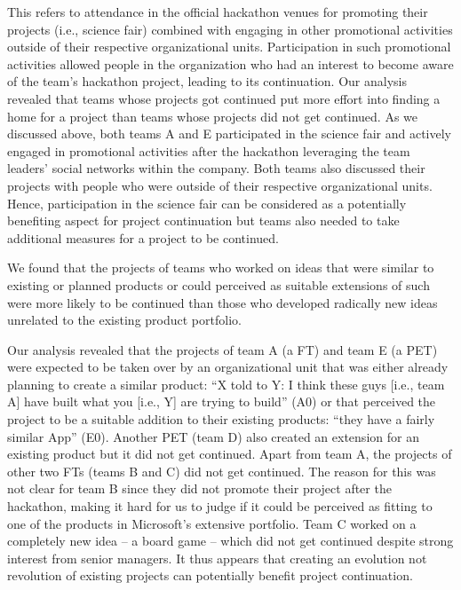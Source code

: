 \documentclass{hcij}
\begin{document}
This refers to attendance in the official hackathon venues for promoting their projects (i.e., science fair) combined with engaging in other promotional activities outside of their respective organizational units. Participation in such promotional activities allowed people in the organization who had an interest to become aware of the team’s hackathon project, leading to its continuation. Our analysis revealed that teams whose projects got continued put more effort into finding a home for a project than teams whose projects did not get continued. As we discussed above, both teams A and E participated in the science fair and actively engaged in promotional activities after the hackathon leveraging the team leaders’ social networks within the company. Both teams also discussed their projects with people who were outside of their respective organizational units. Hence, participation in the science fair can be considered as a potentially benefiting aspect for project continuation but teams also needed to take additional measures for a project to be continued.

We found that the projects of teams who worked on ideas that were similar to existing or planned products or could perceived as suitable extensions of such were more likely to be continued than those who developed radically new ideas unrelated to the existing product portfolio.

Our analysis revealed that the projects of team A (a FT) and team E (a PET) were expected to be taken over by an organizational unit that was either already planning to create a similar product: “X told to Y: I think these guys [i.e., team A] have built what you [i.e., Y] are trying to build” (A0) or that perceived the project to be a suitable addition to their existing products: “they have a fairly similar App” (E0). Another PET (team D) also created an extension for an existing product but it did not get continued. Apart from team A, the projects of other two FTs (teams B and C) did not get continued. The reason for this was not clear for team B since they did not promote their project after the hackathon, making it hard for us to judge if it could be perceived as fitting to one of the products in Microsoft’s extensive portfolio. Team C worked on a completely new idea – a board game – which did not get continued despite strong interest from senior managers. It thus appears that creating an evolution not revolution of existing projects can potentially benefit project continuation.
\end{document}
